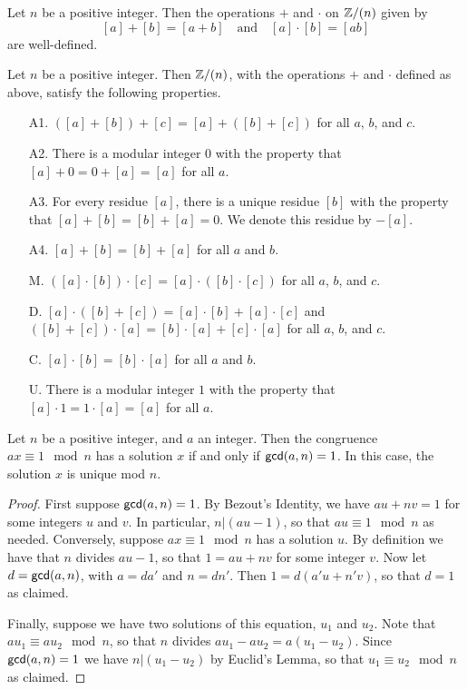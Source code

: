 \begin{cor}
Let \(n\) be a positive integer. Then the operations \(+\) and \(\cdot\) on \(\mathbb{Z}/(n)\) given by \[ [a] + [b] = [a+b] \quad \mathrm{and} \quad [a] \cdot [b] = [ab] \] are well-defined.
\end{cor}

\begin{prop}
Let \(n\) be a positive integer. Then \(\mathbb{Z}/(n)\), with the operations \(+\) and \(\cdot\) defined as above, satisfy the following properties.
\begin{itemize}
\item[A1.] \(\left([a] + [b]\right) + [c] = [a] + \left([b] + [c]\right)\) for all \(a\), \(b\), and \(c\).
\item[A2.] There is a modular integer \(0\) with the property that \([a] + 0 = 0 + [a] = [a]\) for all \(a\).
\item[A3.] For every residue \([a]\), there is a unique residue \([b]\) with the property that \([a] + [b] = [b] + [a] = 0\). We denote this residue by \(-[a]\).
\item[A4.] \([a] + [b] = [b] + [a]\) for all \(a\) and \(b\).
\item[M.] \(\left([a] \cdot [b]\right) \cdot [c] = [a] \cdot \left([b] \cdot [c]\right)\) for all \(a\), \(b\), and \(c\).
\item[D.] \([a] \cdot \left([b] + [c]\right) = [a] \cdot [b] + [a] \cdot [c]\) and \(\left([b] + [c]\right) \cdot [a] = [b] \cdot [a] + [c] \cdot [a]\) for all \(a\), \(b\), and \(c\).
\item[C.] \([a] \cdot [b] = [b] \cdot [a]\) for all \(a\) and \(b\).
\item[U.] There is a modular integer \(1\) with the property that \([a] \cdot 1 = 1 \cdot [a] = [a]\) for all \(a\).
\end{itemize}
\end{prop}



\begin{prop}
Let \(n\) be a positive integer, and \(a\) an integer. Then the congruence \(ax \equiv 1 \mod n\) has a solution \(x\) if and only if \(\mathsf{gcd}(a, n) = 1\). In this case, the solution \(x\) is unique mod \(n\).
\end{prop}

\begin{proof}
First suppose \(\mathsf{gcd}(a, n) = 1\). By Bezout's Identity, we have \(au + nv = 1\) for some integers \(u\) and \(v\). In particular, \(n|(au - 1)\), so that \(au \equiv 1 \mod n\) as needed. Conversely, suppose \(ax \equiv 1 \mod n\) has a solution \(u\). By definition we have that \(n\) divides \(au - 1\), so that \(1 = au + nv\) for some integer \(v\). Now let \(d = \mathsf{gcd}(a, n)\), with \(a = da'\) and \(n = dn'\). Then \(1 = d(a'u + n'v)\), so that \(d = 1\) as claimed.

Finally, suppose we have two solutions of this equation, \(u_1\) and \(u_2\). Note that \(au_1 \equiv au_2 \mod n\), so that \(n\) divides \(au_1 - au_2 = a(u_1 - u_2)\). Since \(\mathsf{gcd}(a, n) = 1\) we have \(n|(u_1 - u_2)\) by Euclid's Lemma, so that \(u_1 \equiv u_2 \mod n\) as claimed.
\end{proof}

